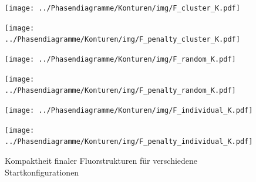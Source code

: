 \documentclass[a4paper, 10pt, twoside, openany]{book} %
\begin{document}
	\begin{figure}
		\begin{minipage}[t]{0.48\textwidth}
			\texttt{[image: ../Phasendiagramme/Konturen/img/F\_cluster\_K.pdf]}
			\label{F_cluster_K}
		\end{minipage}
		\hfill
		\begin{minipage}[t]{0.48\textwidth}
			\texttt{[image: ../Phasendiagramme/Konturen/img/F\_penalty\_cluster\_K.pdf]}
			\label{F_penalty_cluster_K}
		\end{minipage}
		\begin{minipage}[t]{0.48\textwidth}
			\texttt{[image: ../Phasendiagramme/Konturen/img/F\_random\_K.pdf]}
			\label{F_random_K}
		\end{minipage}
		\hfill
		\begin{minipage}[t]{0.48\textwidth}
			\texttt{[image: ../Phasendiagramme/Konturen/img/F\_penalty\_random\_K.pdf]}
			\label{F_penalty_random_K}
		\end{minipage}
		\begin{minipage}[t]{0.48\textwidth}
			\texttt{[image: ../Phasendiagramme/Konturen/img/F\_individual\_K.pdf]}
			\label{F_individual_K}
		\end{minipage}
		\hfill
		\begin{minipage}[t]{0.48\textwidth}
			\texttt{[image: ../Phasendiagramme/Konturen/img/F\_penalty\_individual\_K.pdf]}
			\label{F_penalty_individual_K}
		\end{minipage}
		\caption[Kompaktheit finaler Fluorstrukturen]{Kompaktheit finaler Fluorstrukturen für verschiedene Startkonfigurationen}
		\label{F_K}
	\end{figure}
	
\end{document}
